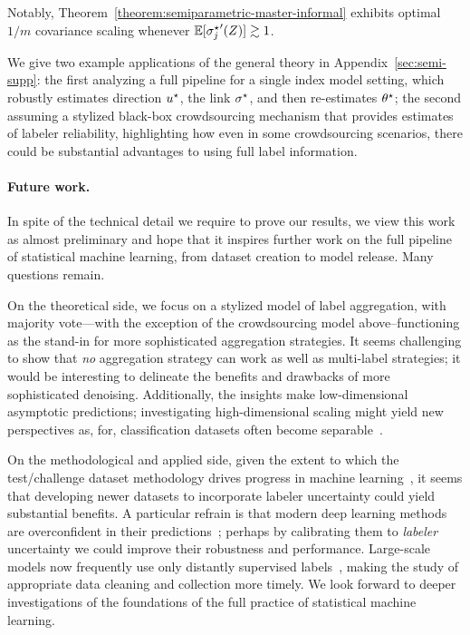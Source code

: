 \noindent
Notably, Theorem~\ref{theorem:semiparametric-master-informal} exhibits optimal
$1/m$ covariance scaling whenever $\mathbb{E}[{\sigma^\star_j}'(Z)] \gtrsim 1$.

We give two example applications of the general
theory in Appendix~\ref{sec:semi-supp}: the first analyzing a full pipeline
for a single index model setting, which robustly estimates direction $u^\star$,
the link $\sigma^\star$, and then re-estimates $\theta^\star$; the second
assuming a stylized black-box crowdsourcing mechanism that provides
estimates of labeler reliability, highlighting how even in some
crowdsourcing scenarios, there could be substantial advantages to using full
label information.

\paragraph{Future work.}

In spite of the technical detail we require to prove our results,
we view this work as almost preliminary and hope that it inspires further
work on the full pipeline of statistical machine learning,
from dataset creation to model release.
%
Many questions remain.

On the theoretical side, we focus on a stylized model of
label aggregation, with majority vote---with the exception of the
crowdsourcing model above--functioning as the
stand-in for more sophisticated aggregation strategies. It seems challenging
to show that \emph{no} aggregation strategy can work as well as multi-label
strategies; it would be interesting to delineate the benefits
and drawbacks of more sophisticated denoising.
Additionally, the insights make low-dimensional asymptotic predictions;
investigating high-dimensional scaling might yield new perspectives
as, for, classification datasets often become
separable~\cite{CandesSu19pnas}.

On the methodological and applied side, given the extent to which the
test/challenge dataset methodology drives progress in machine
learning~\cite{Donoho17}, it seems that developing newer datasets to
incorporate labeler uncertainty could yield substantial benefits.  A
particular refrain is that modern deep learning methods are overconfident in
their predictions~\cite{GoodfellowShSz15}; perhaps by
calibrating them to \emph{labeler} uncertainty we could
improve their robustness and performance.
%
Large-scale
models now frequently use only distantly supervised
labels~\cite{RadfordKiHaRaGoAgSaAsMiClKrSu21}, making
the study of appropriate data cleaning and collection more timely.
We look forward to deeper
investigations of the foundations of the full
practice of statistical machine learning.
